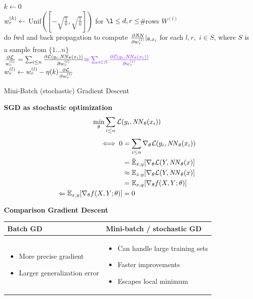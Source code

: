 \begin{algorithm}[H]  
	$k\gets 0$ \\
	$w^{(k)}_r \gets$ Unif$([-\sqrt{\frac{1}{n}}, \sqrt{\frac{1}{n}}])$ for $\l \leq d, r\leq$\#rows $W^{(l)}$ \\
   {
      do fwd and back propagation to compute $\frac{\partial \mathit{NN}}{\partial w^{(l)}_r} \vert_{\theta, x_i} $ for each $l,r,$ {\color{imp}$i\in S$, where $S$ is a sample from $\{1...n\}$} \\ 

      $\frac{\partial\L}{\weight{l}_r} =\sumin \frac{\partial \L(y_i, \NN_\theta(x_i))}{\partial \weight{l}_r} {\color{imp}\approx \sum_{i\in S}\frac{\partial \L(y_i, \NN_\theta(x_i))}{\partial \weight{l}_r}}$ \\
      $w^{(l)}_r \gets w^{(l)}_r - \eta(k) \frac{\partial \mathcal L}{\partial w^{(l)}_r}$
  	}
  \caption{Mini-Batch (stochastic) Gradient Descent}
\end{algorithm}

\textbf{SGD as stochastic optimization}
$$
	\min_\theta \sum_{i\leq n} \mathcal L(y_i, \mathit{NN}_\theta(x_i))
$$
\begin{align*}
	\iff 0 	&= \sum_{i\leq n}\nabla_\theta\mathcal L(y_i, \mathit{NN}_\theta(x_i)) \\
			&= \hat{\mathbb E}_{x,y}[\nabla_\theta\mathcal L(Y, \mathit{NN}_\theta(x)] \\
			&\approx \mathbb E_{x,y}[\nabla_\theta\mathcal L(Y, \mathit{NN}_\theta(x)] \\
			&= \mathbb E_{x,y}[\nabla_\theta f(X,Y; \theta)] \\
			\Leftarrow \mathbb E_{x,y}[\nabla_\theta f(X,Y; \theta)] &= 0
\end{align*}

\textbf{Comparison Gradient Descent}

\begin{center}
	\begin{tabular}{ p{} | p{} } 
		\textbf{Batch GD} & \textbf{Mini-batch / stochastic GD}\\\hline
		\begin{itemize}[leftmargin=*]
			\item More precise gradient
			\item Larger generalization error
		\end{itemize}
		&
		\begin{itemize}[leftmargin=*]
			\item Can handle large training sets
			\item Faster improvements
			\item Escapes local minimum
		\end{itemize}
	\end{tabular}
\end{center}

